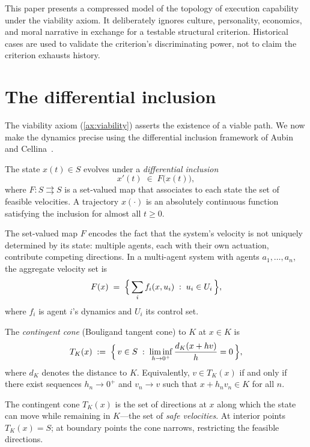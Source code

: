 \begin{remark}[Scope]\label{rem:scope}
This paper presents a compressed model of the topology of execution
capability under the viability axiom. It deliberately ignores culture,
personality, economics, and moral narrative in exchange for a testable
structural criterion. Historical cases are used to validate the
criterion's discriminating power, not to claim the criterion exhausts
history.
\end{remark}

\section{The differential inclusion}\label{sec:di}

The viability axiom (\cref{ax:viability}) asserts the existence of a
viable path.  We now make the dynamics precise using the differential
inclusion framework of Aubin and Cellina~\cite{aubin,aubincellina}.

\begin{definition}\label{def:di}
The state $x(t) \in S$ evolves under a \emph{differential inclusion}
\[
  x'(t) \;\in\; F\bigl(x(t)\bigr),
\]
where $F: S \rightrightarrows S$ is a set-valued map that associates
to each state the set of feasible velocities.  A trajectory
$x(\cdot)$ is an absolutely continuous function satisfying the
inclusion for almost all $t \geq 0$.
\end{definition}

The set-valued map $F$ encodes the fact that the system's velocity is
not uniquely determined by its state: multiple agents, each with their
own actuation, contribute competing directions.  In a multi-agent
system with agents $a_1, \ldots, a_n$, the aggregate velocity set is
\[
  F(x) \;=\; \Bigl\{\, \sum_{i} f_i(x, u_i) \;:\;
  u_i \in U_i \,\Bigr\},
\]
where $f_i$ is agent $i$'s dynamics and $U_i$ its control set.

\begin{definition}\label{def:contingent}
The \emph{contingent cone} (Bouligand tangent cone) to $K$ at
$x \in K$ is
\[
  T_K(x) \;:=\; \Bigl\{\, v \in S \;:\;
  \liminf_{h \to 0^+} \frac{d_K(x + hv)}{h} = 0 \,\Bigr\},
\]
where $d_K$ denotes the distance to $K$.  Equivalently,
$v \in T_K(x)$ if and only if there exist sequences $h_n \to 0^+$
and $v_n \to v$ such that $x + h_n v_n \in K$ for all $n$.
\end{definition}

The contingent cone $T_K(x)$ is the set of directions at $x$ along
which the state can move while remaining in $K$---the set of
\emph{safe velocities}.  At interior points $T_K(x) = S$; at
boundary points the cone narrows, restricting the feasible
directions.

